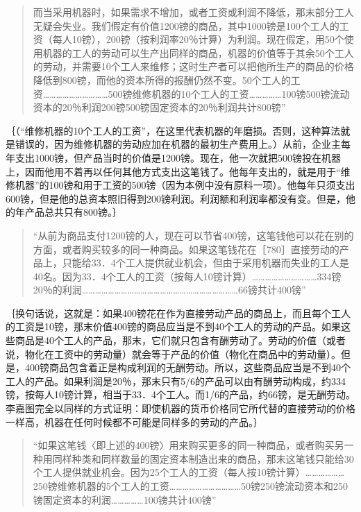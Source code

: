 \begin{quote}{而当采用机器时，如果需求不增加，或者工资或利润不降低，那末部分工人无疑会失业。我们假定有价值1200镑的商品，其中1000镑是100个工人的工资（每人10镑），200镑（按利润率20％计算）为利润。现在假定，用50个使用机器的工人的劳动可以生产出同样的商品，机器的价值等于其余50个工人的劳动，并需要10个工人来维修；这时生产者可以把他所生产的商品的价格降低到800镑，而他的资本所得的报酬仍然不变。50个工人的工资…………………………500镑维修机器的10个工人的工资……………100镑500镑流动资本的20％利润200镑500镑固定资本的20％利润共计800镑”}\end{quote}

｛（“维修机器的10个工人的工资”，在这里代表机器的年磨损。否则，这种算法就是错误的，因为维修机器的劳动应加在机器的最初生产费用上。）从前，企业主每年支出1000镑，但产品当时的价值是1200镑。现在，他一次就把500镑投在机器上，因而他用不着再以任何其他方式支出这笔钱了。他每年支出的，就是用于“维修机器”的100镑和用于工资的500镑（因为本例中没有原料一项）。他每年只须支出600镑，但是他的总资本照旧得到200镑利润。利润额和利润率都没有变。但是，他的年产品总共只有800镑。｝

\begin{quote}{“从前为商品支付1200镑的人，现在可以节省400镑，这笔钱他可以花在别的方面，或者购买较多的同一种商品。如果这笔钱花在［780］直接劳动的产品上，只能给33．4个工人提供就业机会，但由于采用机器而失业的工人是40名。因为33．4个工人的工资（按每人10镑计算）…………………………334镑20％的利润………………………………………………………………66镑共计400镑”}\end{quote}

｛换句话说，这就是：如果400镑花在作为直接劳动产品的商品上，而且每个工人的工资是10镑，那末价值400镑的商品应当是不到40个工人的劳动的产品。如果这些商品是40个工人的产品，那末，它们就只包含有酬劳动了。劳动的价值（或者说，物化在工资中的劳动量）就会等于产品的价值（物化在商品中的劳动量）。但是，400镑商品包含着正是构成利润的无酬劳动。所以，这些商品应当是不到40个工人的产品。如果利润是20％，那末只有5/6的产品可以由有酬劳动构成，约334镑，按每人10镑计算，相当于33．4个工人。而1/6的产品，约66镑，是无酬劳动。李嘉图完全以同样的方式证明：即使机器的货币价格同它所代替的直接劳动的价格一样高，机器在任何时候都不可能是同样多的劳动的产品。｝

\begin{quote}{“如果这笔钱〈即上述的400镑〉用来购买更多的同一种商品，或者购买另一种用同样种类和同样数量的固定资本制造出来的商品，那末这笔钱只能给30个工人提供就业机会。因为25个工人的工资（每人按10镑计算）………………250镑维修机器的5个工人的工资……………………………50镑250镑流动资本和250镑固定资本的利润……………100镑共计400镑”}\end{quote}

